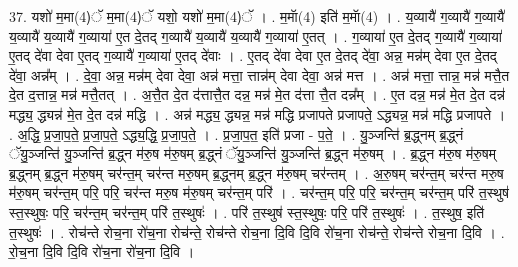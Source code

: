 \documentclass[17pt]{extarticle}
\begin{document}
37. यशो॑ म॒मा(4)ॅ म॒मा(4)ॅ यशो॒ यशो॑ म॒मा(4)ॅ । . म॒माॅ(4) इति॑ म॒माॅ(4) । . य॒व्यायै॑ ग॒व्यायै॑ ग॒व्यायै॑ य॒व्यायै॑ य॒व्यायै॑ ग॒व्याया॑ ए॒त दे॒तद् ग॒व्यायै॑ य॒व्यायै॑ य॒व्यायै॑ ग॒व्याया॑ ए॒तत् । . ग॒व्याया॑ ए॒त दे॒तद् ग॒व्यायै॑ ग॒व्याया॑ ए॒तद् दे॑वा देवा ए॒तद् ग॒व्यायै॑ ग॒व्याया॑ ए॒तद् दे॑वाः । . ए॒तद् दे॑वा देवा ए॒त दे॒तद् दे॑वा॒ अन्न॒ मन्न॑म् देवा ए॒त दे॒तद् दे॑वा॒ अन्न᳚म् । . दे॒वा॒ अन्न॒ मन्न॑म् देवा देवा॒ अन्न॑ मत्ता॒ त्तान्न॑म् देवा देवा॒ अन्न॑ मत्त । . अन्न॑ मत्ता॒ त्तान्न॒ मन्न॑ मत्तै॒त दे॒त द॒त्तान्न॒ मन्न॑ मत्तै॒तत् । . अ॒त्तै॒त दे॒त द॑त्तात्तै॒त दन्न॒ मन्न॑ मे॒त द॑त्ता त्तै॒त दन्न᳚म् । . ए॒त दन्न॒ मन्न॑ मे॒त दे॒त दन्न॑ मद्ध्य॒ द्ध्यन्न॑ मे॒त दे॒त दन्न॑ मद्धि । . अन्न॑ मद्ध्य॒ द्ध्यन्न॒ मन्न॑ मद्धि प्रजापते प्रजापते॒ ऽद्ध्यन्न॒ मन्न॑ मद्धि प्रजापते । . अ॒द्धि॒ प्र॒जा॒प॒ते॒ प्र॒जा॒प॒ते॒ ऽद्ध्य॒द्धि॒ प्र॒जा॒प॒ते॒ । . प्र॒जा॒प॒त॒ इति॑ प्रजा - प॒ते॒ । . यु॒ञ्जन्ति॑ ब्र॒द्ध्नम् ब्र॒द्ध्नं ॅयु॒ञ्जन्ति॑ यु॒ञ्जन्ति॑ ब्र॒द्ध्न म॑रु॒ष म॑रु॒षम् ब्र॒द्ध्नं ॅयु॒ञ्जन्ति॑ यु॒ञ्जन्ति॑ ब्र॒द्ध्न म॑रु॒षम् । . ब्र॒द्ध्न म॑रु॒ष म॑रु॒षम् ब्र॒द्ध्नम् ब्र॒द्ध्न म॑रु॒षम् चर॑न्त॒म् चर॑न्त मरु॒षम् ब्र॒द्ध्नम् ब्र॒द्ध्न म॑रु॒षम् चर॑न्तम् । . अ॒रु॒षम् चर॑न्त॒म् चर॑न्त मरु॒ष म॑रु॒षम् चर॑न्त॒म् परि॒ परि॒ चर॑न्त मरु॒ष म॑रु॒षम् चर॑न्त॒म् परि॑ । . चर॑न्त॒म् परि॒ परि॒ चर॑न्त॒म् चर॑न्त॒म् परि॑ त॒स्थुष॑ स्त॒स्थुषः॒ परि॒ चर॑न्त॒म् चर॑न्त॒म् परि॑ त॒स्थुषः॑ । . परि॑ त॒स्थुष॑ स्त॒स्थुषः॒ परि॒ परि॑ त॒स्थुषः॑ । . त॒स्थुष॒ इति॑ त॒स्थुषः॑ । . रोच॑न्ते रोच॒ना रो॑च॒ना रोच॑न्ते॒ रोच॑न्ते रोच॒ना दि॒वि दि॒वि रो॑च॒ना रोच॑न्ते॒ रोच॑न्ते रोच॒ना दि॒वि । . रो॒च॒ना दि॒वि दि॒वि रो॑च॒ना रो॑च॒ना दि॒वि । \newline
\end{document}
